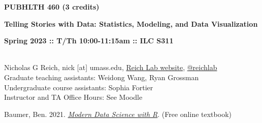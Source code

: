 \documentclass[10pt]{article}
\begin{document}
\centerline{\bf \large PUBHLTH 460 (3 credits)}
\centerline{\bf \large Telling Stories with Data: Statistics, Modeling, and Data Visualization}
\centerline{\bf Spring 2023 :: T/Th 10:00-11:15am :: ILC S311 }

\vspace{.25in}
\\
\noindent Nicholas G Reich,  nick [at] umass.edu,  \href{http://reichlab.github.io}{Reich Lab website},  \href{https://twitter.com/reichlab}{@reichlab}\\
\noindent Graduate teaching assistants: Weidong Wang, Ryan Grossman\\
\noindent Undergraduate course assistants:
Sophia Fortier\\
\noindent Instructor and TA Office Hours: See Moodle






\bigskip
{}


Baumer, Ben. 2021.  \emph{\href{https://mdsr-book.github.io/mdsr2e/}{Modern Data Science with R}}. (Free online textbook)





\end{document}
